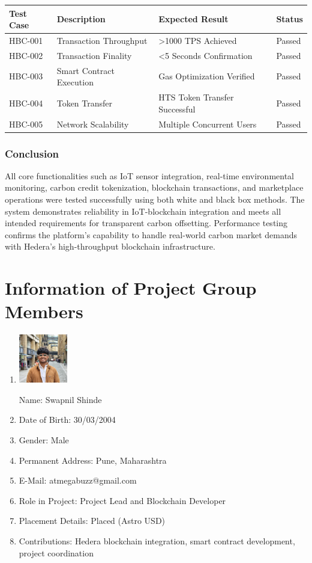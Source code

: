 \documentclass[oneside,a4paper,12pt]{book}
\begin{document}
\begin{appendices}
\begin{longtable}{|p{2cm}|p{4cm}|p{3.5cm}|p{2cm}|}
\hline
\textbf{Test Case} & \textbf{Description} & \textbf{Expected Result} & \textbf{Status} \\
\hline
HBC-001 & Transaction Throughput & >1000 TPS Achieved & Passed \\
\hline
HBC-002 & Transaction Finality & <5 Seconds Confirmation & Passed \\
\hline
HBC-003 & Smart Contract Execution & Gas Optimization Verified & Passed \\
\hline
HBC-004 & Token Transfer & HTS Token Transfer Successful & Passed \\
\hline
HBC-005 & Network Scalability & Multiple Concurrent Users & Passed \\
\hline
\end{longtable}

\subsection{Conclusion}
All core functionalities such as IoT sensor integration, real-time environmental monitoring, carbon credit tokenization, blockchain transactions, and marketplace operations were tested successfully using both white and black box methods. The system demonstrates reliability in IoT-blockchain integration and meets all intended requirements for transparent carbon offsetting. Performance testing confirms the platform's capability to handle real-world carbon market demands with Hedera's high-throughput blockchain infrastructure.


\chapter{Information of Project Group Members}

\newpage
\begin{enumerate}
\item \begin{flushright}\includegraphics[width=60pt]{swapnil-pfp.jpeg}\end{flushright}
Name: Swapnil Shinde  
\item Date of Birth: 30/03/2004
\item Gender: Male
\item Permanent Address: Pune, Maharashtra
\item E-Mail: atmegabuzz@gmail.com
\item Role in Project: Project Lead and Blockchain Developer
\item Placement Details: Placed (Astro USD)
\item Contributions: Hedera blockchain integration, smart contract development, project coordination
\end{enumerate}


\end{appendices}
\end{document}
